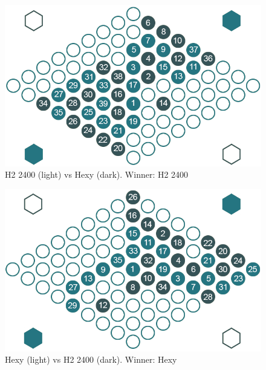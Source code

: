 \begin{figure}[ht]
	\centering
	\includegraphics[width=.75\textwidth]{graphics/games/h2-2400-hexy.png}
	\caption{H2 2400 (light) vs Hexy (dark). Winner: H2 2400}
	\label{fig-h2-2400-hexy}
\end{figure}
\vspace{1cm}

\begin{figure}[ht]
	\centering
	\includegraphics[width=.75\textwidth]{graphics/games/hexy-h2-2400.png}
	\caption{Hexy (light) vs H2 2400 (dark). Winner: Hexy}
	\label{fig-hexy-h2-2400}
\end{figure}
\vspace{1cm}

